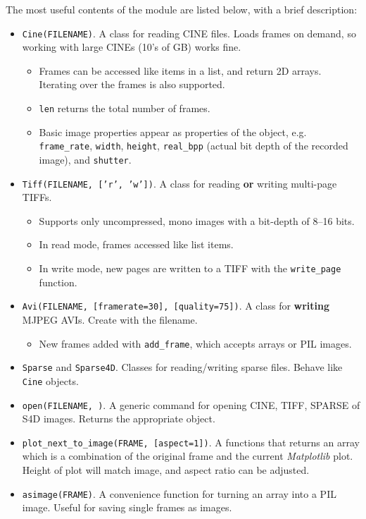 \documentclass[11pt]{amsart}
\begin{document}
The most useful contents of the module are listed below, with a brief description:
\begin{itemize}
\item \texttt{Cine(FILENAME)}.  A class for reading CINE files. Loads frames on demand, so working with large CINEs (10's of GB) works fine.
\begin{itemize}
\item Frames can be accessed like items in a list, and return 2D arrays.  Iterating over the frames is also supported.
\item \texttt{len} returns the total number of frames.
\item Basic image properties appear as properties of the object, e.g. \texttt{frame\_rate}, \texttt{width}, \texttt{height}, \texttt{real\_bpp} (actual bit depth of the recorded image), and \texttt{shutter}.
\end{itemize}
\item \texttt{Tiff(FILENAME, ['r', 'w'])}.  A class for reading {\bf or} writing multi-page TIFFs.  %
\begin{itemize}
\item Supports only uncompressed, mono images with a bit-depth of 8--16 bits.
\item In read mode, frames accessed like list items.
\item In write mode, new pages are written to a TIFF with the \texttt{write\_page} function.
\end{itemize}
\item \texttt{Avi(FILENAME, [framerate=30], [quality=75])}. A class for {\bf writing} MJPEG AVIs.  Create with the filename.
\begin{itemize}
\item New frames added with \texttt{add\_frame}, which accepts arrays or PIL images.
\end{itemize}
\item \texttt{Sparse} and \texttt{Sparse4D}. Classes for reading/writing sparse files.  Behave like \texttt{Cine} objects.
\item \texttt{open(FILENAME, )}. A generic command for opening CINE, TIFF, SPARSE of S4D images.  Returns the appropriate object.
\item \texttt{plot\_next\_to\_image(FRAME, [aspect=1])}. A functions that returns an array which is a combination of the original frame and the current \emph{Matplotlib} plot.  Height of plot will match image, and aspect ratio can be adjusted.
\item \texttt{asimage(FRAME)}.  A convenience function for turning an array into a PIL image.  Useful for saving single frames as images.
\end{itemize}
\end{document}
